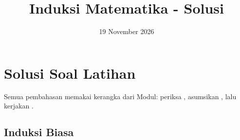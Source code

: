 \documentclass[12pt]{scrartcl}
\title{Induksi Matematika - Solusi}
\date{19 November 2026}
\begin{document}
\maketitle

\renewcommand*\contentsname{Daftar Isi}
\tableofcontents

\newpage

\section{Solusi Soal Latihan}

Semua pembahasan memakai kerangka dari Modul:
periksa , asumsikan
,
lalu kerjakan .

\subsection{Induksi Biasa}
\end{document}
